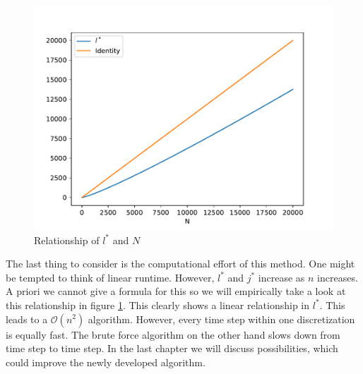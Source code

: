\documentclass[12pt,a4paper,twoside, open=right]{scrreprt}
\theoremstyle{definition}
\theoremstyle{plain}
\begin{document}
\begin{figure}
    \centering
    \includegraphics[width=\textwidth]{runtime}
    \caption{Relationship of $l^*$ and $N$}
    \label{fig:runtime}
\end{figure}
The last thing to consider is the computational effort of this method. One might be tempted to think of linear runtime. However, $l^*$ and $j^*$ increase as $n$ increases. A priori we cannot give a formula for this so we will empirically take a look at this relationship in figure \ref{fig:runtime}. This clearly shows a linear relationship in $l^*$. This leads to a $\mathcal{O}(n^2)$ algorithm. However, every time step within one discretization is equally fast. The brute force algorithm on the other hand slows down from time step to time step. In the last chapter we will discuss possibilities, which could improve the newly developed algorithm.
\end{document}
